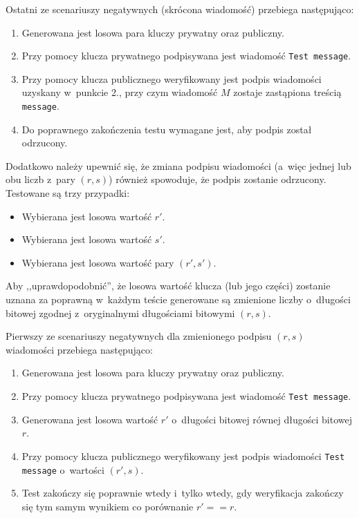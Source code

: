 \documentclass{article}
\begin{document}
        Ostatni ze scenariuszy negatywnych (skrócona wiadomość) przebiega następująco:
        
        \begin{enumerate}
            \item Generowana jest losowa para kluczy prywatny oraz publiczny.
            \item Przy pomocy klucza prywatnego podpisywana jest wiadomość \verb+Test message+.
            \item Przy pomocy klucza publicznego weryfikowany jest podpis wiadomości uzyskany w~punkcie 2., przy czym wiadomość $M$ zostaje zastąpiona treścią \verb+message+.
            \item Do poprawnego zakończenia testu wymagane jest, aby podpis został odrzucony.
        \end{enumerate}
        
        Dodatkowo należy upewnić się, że zmiana podpisu wiadomości (a~więc jednej lub obu liczb z~pary $(r, s)$) również spowoduje, że podpis zostanie odrzucony. Testowane są trzy przypadki:
        
        \begin{itemize}
            \item Wybierana jest losowa wartość $r'$.
            \item Wybierana jest losowa wartość $s'$.
            \item Wybierana jest losowa wartość pary $(r', s')$.
        \end{itemize}

        \noindent Aby ,,uprawdopodobnić'', że losowa wartość klucza (lub jego części) zostanie uznana za poprawną w~każdym teście generowane są zmienione liczby o~długości bitowej zgodnej z~oryginalnymi długościami bitowymi $(r, s)$.

        Pierwszy ze scenariuszy negatywnych dla zmienionego podpisu $(r, s)$ wiadomości przebiega następująco:
        
        \begin{enumerate}
            \item Generowana jest losowa para kluczy prywatny oraz publiczny.
            \item Przy pomocy klucza prywatnego podpisywana jest wiadomość \verb+Test message+.
            \item Generowana jest losowa wartość $r'$ o~długości bitowej równej długości bitowej $r$.
            \item Przy pomocy klucza publicznego weryfikowany jest podpis wiadomości \verb+Test message+ o~wartości $(r', s)$.
            \item Test zakończy się poprawnie wtedy i~tylko wtedy, gdy weryfikacja zakończy się tym samym wynikiem co porównanie $r' == r$.
        \end{enumerate}
        
\end{document}
